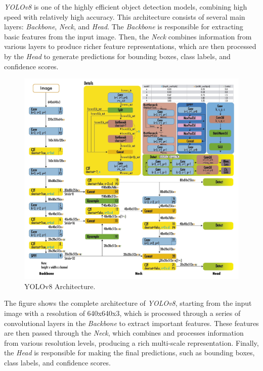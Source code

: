 \emph{YOLOv8} is one of the highly efficient object detection models, combining high speed with relatively high accuracy. This architecture consists of several main layers: \emph{Backbone}, \emph{Neck}, and \emph{Head}. The \emph{Backbone} is responsible for extracting basic features from the input image. Then, the \emph{Neck} combines information from various layers to produce richer feature representations, which are then processed by the \emph{Head} to generate predictions for bounding boxes, class labels, and confidence scores.

\begin{figure}[H] 
  \centering 
  \includegraphics[scale=0.4]{gambar/YoloV8Architecture.jpg} 
  \caption{YOLOv8 Architecture.} 
  \label{fig:YOLOv8Architecture} 
\end{figure}

The figure shows the complete architecture of \emph{YOLOv8}, starting from the input image with a resolution of 640x640x3, which is processed through a series of convolutional layers in the \emph{Backbone} to extract important features. These features are then passed through the \emph{Neck}, which combines and processes information from various resolution levels, producing a rich multi-scale representation. Finally, the \emph{Head} is responsible for making the final predictions, such as bounding boxes, class labels, and confidence scores.

